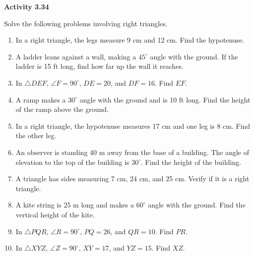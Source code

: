 \vspace{0.3ex}
\noindent\textbf{Activity 3.34}

\vspace{0.2ex}

Solve the following problems involving right triangles.

\begin{enumerate}[label=\color{blue}\arabic*.]
    \item In a right triangle, the legs measure 9 cm and 12 cm. Find the hypotenuse.
    \item A ladder leans against a wall, making a \(45^\circ\) angle with the ground. If the ladder is 15 ft long, find how far up the wall it reaches.
    \item In \(\triangle DEF\), \(\angle F = 90^\circ\), \(DE = 20\), and \(DF = 16\). Find \(EF\).
    \item A ramp makes a \(30^\circ\) angle with the ground and is 10 ft long. Find the height of the ramp above the ground.
    \item In a right triangle, the hypotenuse measures 17 cm and one leg is 8 cm. Find the other leg.
    \item An observer is standing 40 m away from the base of a building. The angle of elevation to the top of the building is \(30^\circ\). Find the height of the building.
    \item A triangle has sides measuring 7 cm, 24 cm, and 25 cm. Verify if it is a right triangle.
    \item A kite string is 25 m long and makes a \(60^\circ\) angle with the ground. Find the vertical height of the kite.
    \item In \(\triangle PQR\), \(\angle R = 90^\circ\), \(PQ = 26\), and \(QR = 10\). Find \(PR\).
    \item In \(\triangle XYZ\), \(\angle Z = 90^\circ\), \(XY = 17\), and \(YZ = 15\). Find \(XZ\).
\end{enumerate}
